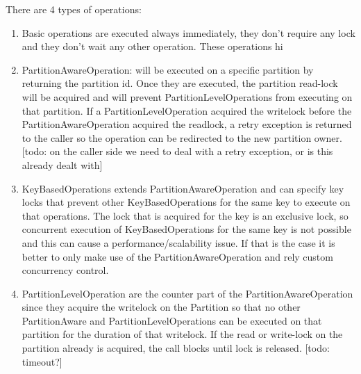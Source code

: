 There are 4 types of operations:
\begin{enumerate}
\item Basic operations are executed always immediately, they don't require any lock and they don't wait any other operation. These operations hi
\item PartitionAwareOperation: will be executed on a specific partition by returning the partition id. Once they are executed, the partition read-lock will be acquired and will prevent PartitionLevelOperations from executing on that partition. If a PartitionLevelOperation acquired the writelock before the PartitionAwareOperation acquired the readlock, a retry exception is returned to the caller so the operation can be redirected to the new partition owner. [todo: on the caller side we need to deal with a retry exception, or is this already dealt with]
\item KeyBasedOperations extends PartitionAwareOperation and can specify key locks that prevent other KeyBasedOperations for the same key to execute on that operations. The lock that is acquired for the key is an exclusive lock, so concurrent execution of  KeyBasedOperations for the same key is not possible and this can cause a performance/scalability issue. If that is the case it is better to only make use of the PartitionAwareOperation and rely custom concurrency control.
\item PartitionLevelOperation are the counter part of the PartitionAwareOperation since they acquire the writelock on the Partition so that no other PartitionAware and PartitionLevelOperations can be executed on that partition for the duration of that writelock. If the read or write-lock on the partition already is acquired, the call blocks until lock is released. [todo: timeout?]
\end{enumerate}

